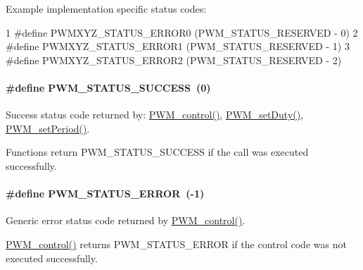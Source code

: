 Example implementation specific status codes\+: 
\begin{DoxyCode}
1 #define PWMXYZ\_STATUS\_ERROR0    (PWM\_STATUS\_RESERVED - 0)
2 #define PWMXYZ\_STATUS\_ERROR1    (PWM\_STATUS\_RESERVED - 1)
3 #define PWMXYZ\_STATUS\_ERROR2    (PWM\_STATUS\_RESERVED - 2)
\end{DoxyCode}
\paragraph[{P\+W\+M\+\_\+\+S\+T\+A\+T\+U\+S\+\_\+\+S\+U\+C\+C\+E\+S\+S}]{\setlength{\rightskip}{0pt plus 5cm}\#define P\+W\+M\+\_\+\+S\+T\+A\+T\+U\+S\+\_\+\+S\+U\+C\+C\+E\+S\+S~(0)}\label{_p_w_m_8h_a9b234f3cd0bdffc3da5b56a6c4db9563}


Success status code returned by\+: \hyperlink{_p_w_m_8h_ade999f5b12997479efa1ac85aaf46ef5}{P\+W\+M\+\_\+control()}, \hyperlink{_p_w_m_8h_a90979a3b8d525f266c2b82e012f68cee}{P\+W\+M\+\_\+set\+Duty()}, \hyperlink{_p_w_m_8h_ae40714354f46dd6d30dbfb14473c73e0}{P\+W\+M\+\_\+set\+Period()}. 

Functions return P\+W\+M\+\_\+\+S\+T\+A\+T\+U\+S\+\_\+\+S\+U\+C\+C\+E\+S\+S if the call was executed successfully. 
\paragraph[{P\+W\+M\+\_\+\+S\+T\+A\+T\+U\+S\+\_\+\+E\+R\+R\+O\+R}]{\setlength{\rightskip}{0pt plus 5cm}\#define P\+W\+M\+\_\+\+S\+T\+A\+T\+U\+S\+\_\+\+E\+R\+R\+O\+R~(-\/1)}\label{_p_w_m_8h_a739297dfb10ab4363e7b5db30fdd1ce0}


Generic error status code returned by \hyperlink{_p_w_m_8h_ade999f5b12997479efa1ac85aaf46ef5}{P\+W\+M\+\_\+control()}. 

\hyperlink{_p_w_m_8h_ade999f5b12997479efa1ac85aaf46ef5}{P\+W\+M\+\_\+control()} returns P\+W\+M\+\_\+\+S\+T\+A\+T\+U\+S\+\_\+\+E\+R\+R\+O\+R if the control code was not executed successfully. 
